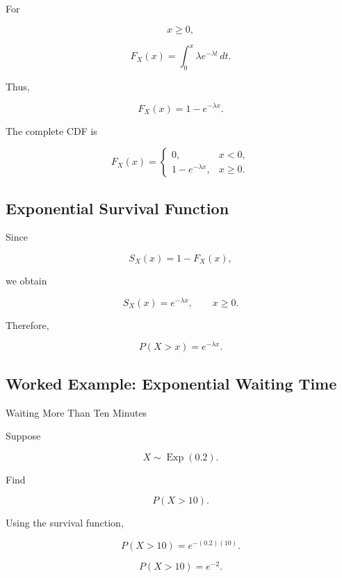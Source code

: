 For

\[
x\geq0,
\]

\[
F_X(x)
=
\int_0^x
\lambda e^{-\lambda t}\,dt.
\]

Thus,

\[
\boxed{
F_X(x)
=
1-e^{-\lambda x}.
}
\]

The complete CDF is

\[
\boxed{
F_X(x)
=
\begin{cases}
0,&x<0,\\
1-e^{-\lambda x},&x\geq0.
\end{cases}
}
\]

\subsection{Exponential Survival Function}
\label{subsec:exponential-survival}

Since

\[
S_X(x)=1-F_X(x),
\]

we obtain

\[
\boxed{
S_X(x)
=
e^{-\lambda x},
\qquad
x\geq0.
}
\]

Therefore,

\[
\boxed{
P(X>x)
=
e^{-\lambda x}.
}
\]

\subsection{Worked Example: Exponential Waiting Time}
\label{subsec:worked-exponential-wait}

\begin{workedexamplebox}{Waiting More Than Ten Minutes}

Suppose

\[
X\sim\operatorname{Exp}(0.2).
\]

Find

\[
P(X>10).
\]

Using the survival function,

\[
P(X>10)
=
e^{-(0.2)(10)}.
\]

\begin{answerbox}
\[
\boxed{
P(X>10)=e^{-2}.
}
\]
\end{answerbox}

\end{workedexamplebox}

